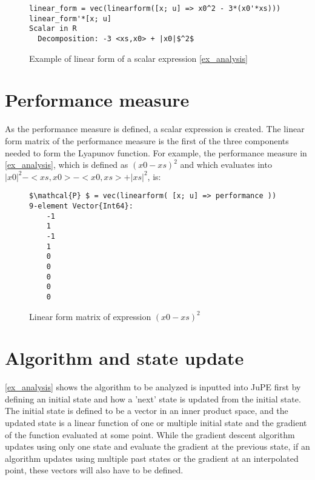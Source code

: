 \begin{figure}[h!]
    \begin{lstlisting}[mathescape] 
linear_form = vec(linearform([x; u] => x0^2 - 3*(x0'*xs)))
linear_form'*[x; u]
Scalar in R
  Decomposition: -3 <xs,x0> + |x0|$^2$
\end{lstlisting}    
\caption{Example of linear form of a scalar expression \ref{ex_analysis}}
\label{ex_linearform}
\end{figure}

\section{Performance measure}
As the performance measure is defined, a scalar expression is created. The linear form matrix of the performance measure is the first of the three components needed to form the Lyapunov function. For example, the performance measure in \ref{ex_analysis}, which is defined as $(x0-xs)^2$ and which evaluates into $|x0|^2 - <xs, x0> - <x0, xs> + |xs|^2$, is:
\begin{figure}[h!]
\begin{lstlisting}[mathescape]
$\mathcal{P} $ = vec(linearform( [x; u] => performance ))
9-element Vector{Int64}:
    -1
    1
    -1
    1
    0
    0
    0
    0
    0
\end{lstlisting}
\caption{Linear form matrix of expression $(x0-xs)^2$}
\label{ex_linearform}
\end{figure}

\section{Algorithm and state update}
\ref{ex_analysis} shows the algorithm to be analyzed is inputted into JuPE first by defining an initial state and how a 'next' state is updated from the initial state. The initial state is defined to be a vector in an inner product space, and the updated state is a linear function of one or multiple initial state and the gradient of the function evaluated at some point. While the gradient descent algorithm updates using only one state and evaluate the gradient at the previous state, if an algorithm updates using multiple past states or the gradient at an interpolated point, these vectors will also have to be defined.


